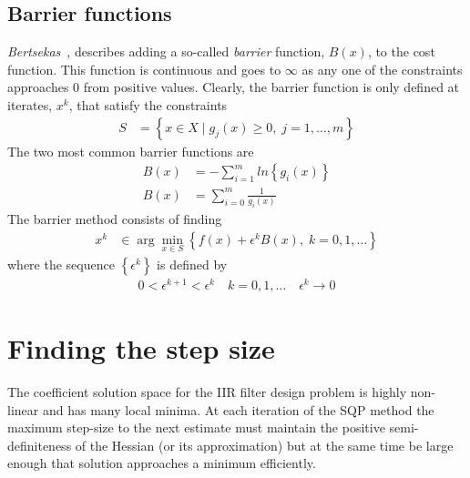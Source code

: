 \documentclass[a4paper,twoside,10pt,english]{report}
\begin{document}
\subsection{Barrier functions}
\label{sub:Barrier-functions}
\emph{Bertsekas}~\cite[Section 4.1]{Bertsekas_NonlinearProgramming}, describes
adding a so-called \emph{barrier} function, $B\left(x\right)$, to
the cost function. This function is continuous and goes to $\infty$
as any one of the constraints approaches $0$ from positive values.
Clearly, the barrier function is only defined at iterates, $x^{k}$,
that satisfy the constraints
\begin{align*}
S &= \left\{ x\in X\mid g_{j}\left(x\right)\ge 0,\; j=1,\ldots,m\right\} 
\end{align*}
The two most common barrier functions are 
\begin{align*}
B\left(x\right) &= -\sum_{i=1}^{m}ln\left\{ g_{i}\left(x\right)\right\} \\
B\left(x\right) &= \sum_{i=0}^{m}\frac{1}{g_{i}\left(x\right)}
\end{align*}
The barrier method consists of finding
\begin{align*}
x^{k} & \in \arg\min_{x\in S}\left\{ f\left(x\right)+\epsilon^{k}B\left(x\right),\; k=0,1,\ldots\right\} 
\end{align*}
where the sequence $\left\{ \epsilon^{k}\right\} $ is defined by
\begin{align*}
0 < \epsilon^{k+1} < \epsilon^{k} \quad k=0,1,\ldots \quad \epsilon^{k}\rightarrow 0
\end{align*}

\section{\label{sub:Finding-the-step}Finding the step size}
The coefficient solution space for the IIR filter design problem is highly
non-linear and has many local minima. At each iteration of the SQP method the
maximum step-size to the next estimate must maintain the positive 
semi-definiteness of the Hessian (or its approximation) but at the same time
be large enough that solution approaches a minimum efficiently.
\end{document}
